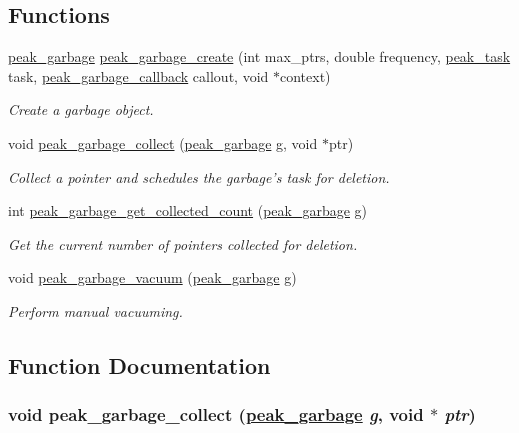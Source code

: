 \subsection*{Functions}
\begin{CompactItemize}
\item 
\hyperlink{group__garbage_ga0}{peak\_\-garbage} \hyperlink{group__garbage_ga2}{peak\_\-garbage\_\-create} (int max\_\-ptrs, double frequency, \hyperlink{group__task__common_ga0}{peak\_\-task} task, \hyperlink{group__garbage_ga1}{peak\_\-garbage\_\-callback} callout, void $\ast$context)
\begin{CompactList}\small\item\em Create a garbage object. \item\end{CompactList}\item 
void \hyperlink{group__garbage_ga3}{peak\_\-garbage\_\-collect} (\hyperlink{group__garbage_ga0}{peak\_\-garbage} g, void $\ast$ptr)
\begin{CompactList}\small\item\em Collect a pointer and schedules the garbage's task for deletion. \item\end{CompactList}\item 
int \hyperlink{group__garbage_ga4}{peak\_\-garbage\_\-get\_\-collected\_\-count} (\hyperlink{group__garbage_ga0}{peak\_\-garbage} g)
\begin{CompactList}\small\item\em Get the current number of pointers collected for deletion. \item\end{CompactList}\item 
void \hyperlink{group__garbage_ga5}{peak\_\-garbage\_\-vacuum} (\hyperlink{group__garbage_ga0}{peak\_\-garbage} g)
\begin{CompactList}\small\item\em Perform manual vacuuming. \item\end{CompactList}\end{CompactItemize}


\subsection{Function Documentation}
\hypertarget{group__garbage_ga3}{
\subsubsection[peak\_\-garbage\_\-collect]{\setlength{\rightskip}{0pt plus 5cm}void peak\_\-garbage\_\-collect (\hyperlink{group__garbage_ga0}{peak\_\-garbage} {\em g}, void $\ast$ {\em ptr})}}
\label{group__garbage_ga3}


